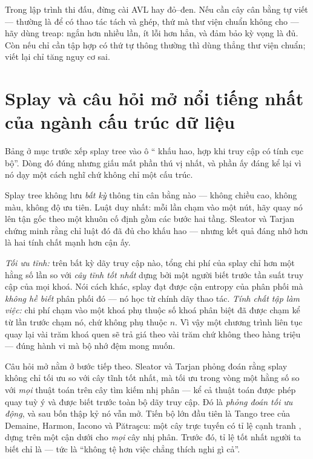 \documentclass[../../algorithm.tex]{subfiles}
\begin{document}
\begin{cambay}
Trong lập trình thi đấu, đừng cài AVL hay đỏ--đen. Nếu cần cây cân bằng tự viết --- thường là để có thao tác tách và ghép, thứ mà thư viện chuẩn không cho --- hãy dùng treap: ngắn hơn nhiều lần, ít lỗi hơn hẳn, và đảm bảo kỳ vọng là đủ. Còn nếu chỉ cần tập hợp có thứ tự thông thường thì dùng thẳng thư viện chuẩn; viết lại chỉ tăng nguy cơ sai.
\end{cambay}

\section{Splay và câu hỏi mở nổi tiếng nhất của ngành cấu trúc dữ liệu}

Bảng ở mục trước xếp splay tree vào ô `` khấu hao, hợp khi truy cập có tính cục bộ''. Dòng đó đúng nhưng giấu mất phần thú vị nhất, và phần ấy đáng kể lại vì nó dạy một cách nghĩ chứ không chỉ một cấu trúc.

Splay tree không lưu \emph{bất kỳ} thông tin cân bằng nào --- không chiều cao, không màu, không độ ưu tiên. Luật duy nhất: mỗi lần chạm vào một nút, hãy quay nó lên tận gốc theo một khuôn cố định gồm các bước hai tầng. Sleator và Tarjan\cite{sleator1985} chứng minh rằng chỉ luật đó đã đủ cho  khấu hao --- nhưng kết quả đáng nhớ hơn là hai tính chất mạnh hơn cận ấy.

\emph{Tối ưu tĩnh:} trên bất kỳ dãy truy cập nào, tổng chi phí của splay chỉ hơn một hằng số lần so với \emph{cây tĩnh tốt nhất} dựng bởi một người biết trước tần suất truy cập của mọi khoá. Nói cách khác, splay đạt được cận entropy của phân phối mà \emph{không hề biết} phân phối đó --- nó học từ chính dãy thao tác. \emph{Tính chất tập làm việc:} chi phí chạm vào một khoá phụ thuộc số khoá phân biệt đã được chạm kể từ lần trước chạm nó, chứ không phụ thuộc \(n\). Vì vậy một chương trình liên tục quay lại vài trăm khoá quen sẽ trả giá theo vài trăm chứ không theo hàng triệu --- đúng hành vi mà bộ nhớ đệm mong muốn.

Câu hỏi mở nằm ở bước tiếp theo. Sleator và Tarjan phỏng đoán rằng splay không chỉ tối ưu so với cây tĩnh tốt nhất, mà tối ưu trong vòng một hằng số so với \emph{mọi} thuật toán trên cây tìm kiếm nhị phân --- kể cả thuật toán được phép quay tuỳ ý và được biết trước toàn bộ dãy truy cập. Đó là \emph{phỏng đoán tối ưu động}, và sau bốn thập kỷ nó vẫn mở. Tiến bộ lớn đầu tiên là Tango tree của Demaine, Harmon, Iacono và Pătraşcu\cite{demaine2007}: một cây trực tuyến có tỉ lệ cạnh tranh , dựng trên một cận dưới cho \emph{mọi} cây nhị phân. Trước đó, tỉ lệ tốt nhất người ta biết chỉ là  --- tức là ``không tệ hơn việc chẳng thích nghi gì cả''.
\end{document}
